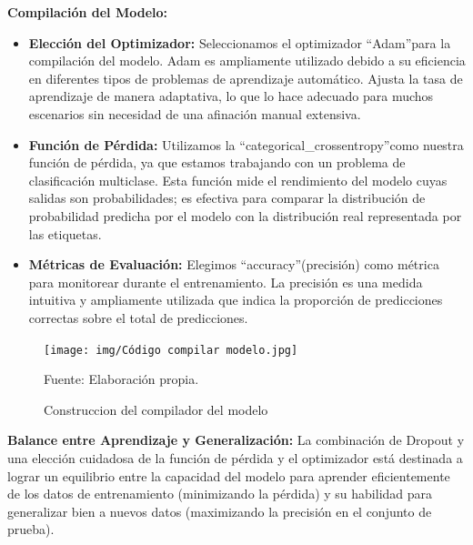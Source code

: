 \textbf{Compilación del Modelo:} 
\begin{itemize}
    \item \textbf{Elección del Optimizador:} Seleccionamos el optimizador \textquotedblleft Adam\textquotedblright para la compilación del modelo. Adam es ampliamente utilizado debido a su eficiencia en diferentes tipos de problemas de aprendizaje automático. Ajusta la tasa de aprendizaje de manera adaptativa, lo que lo hace adecuado para muchos escenarios sin necesidad de una afinación manual extensiva.
    \item \textbf{Función de Pérdida:} Utilizamos la \textquotedblleft categorical\_crossentropy\textquotedblright como nuestra función de pérdida, ya que estamos trabajando con un problema de clasificación multiclase. Esta función mide el rendimiento del modelo cuyas salidas son probabilidades; es efectiva para comparar la distribución de probabilidad predicha por el modelo con la distribución real representada por las etiquetas.
    \item \textbf{Métricas de Evaluación:} Elegimos \textquotedblleft accuracy\textquotedblright (precisión) como métrica para monitorear durante el entrenamiento. La precisión es una medida intuitiva y ampliamente utilizada que indica la proporción de predicciones correctas sobre el total de predicciones.
\end{itemize}

\begin{figure}[H]
    \begin{minipage}[t]{0.9\textwidth}
        \caption{Construccion del compilador del modelo}
        \label{compilar_modelo}        
    \end{minipage}

    \vspace{10pt}

    \begin{minipage}[b]{1\textwidth}
        \centering
        \texttt{[image: img/Código compilar modelo.jpg]}        
    \end{minipage}

    \begin{minipage}[t]{0.9\textwidth}
        Fuente: Elaboración propia.
    \end{minipage}
\end{figure}

\textbf{Balance entre Aprendizaje y Generalización:} La combinación de Dropout y una elección cuidadosa de la función de pérdida y el optimizador está destinada a lograr un equilibrio entre la capacidad del modelo para aprender eficientemente de los datos de entrenamiento (minimizando la pérdida) y su habilidad para generalizar bien a nuevos datos (maximizando la precisión en el conjunto de prueba).

